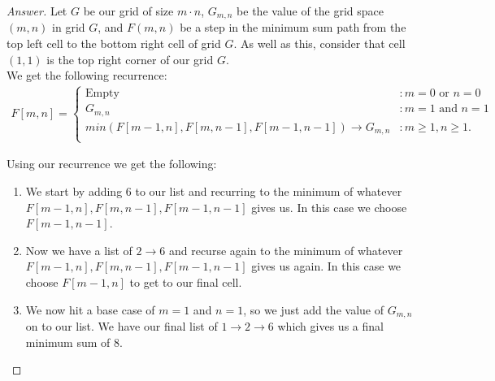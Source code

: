 \documentclass[11pt]{article}
\theoremstyle{definition}
\theoremstyle{definition}
\theoremstyle{definition}
\begin{document}
\begin{proof}[Answer]
Let $G$ be our grid of size $m \cdot n$, $G_{m,n}$ be the value of the grid space $(m , n)$ in grid $G$, and $F(m,n)$ be a step in the minimum sum path from the top left cell to the bottom right cell of grid $G$. As well as this, consider that cell $(1,1)$ is the top right corner of our grid $G$.\\

We get the following recurrence:\\

\begin{align*}
	F[m, n]= \begin{cases}
		\text{Empty} & : m = 0 \text{ or } n = 0 \\
		G_{m,n} &: m = 1 \text{ and } n = 1 \\
		min(F[m - 1, n], F[m , n -1], F[m - 1 , n - 1]) \to G_{m,n} &: m \geq 1, n \geq 1.\\
	\end{cases}
\end{align*}

Using our recurrence we get the following:\\

\begin{enumerate}
	\item  We start by adding $6$ to our list and recurring to the minimum of whatever $F[m - 1, n], F[m , n -1], F[m - 1 , n - 1]$ gives us. In this case we choose $F[m - 1 , n - 1]$.\\
	
	\item Now we have a list of $2 \to 6$ and recurse again to the minimum of whatever $F[m - 1, n], F[m , n -1], F[m - 1 , n - 1]$ gives us again. In this case we choose $F[m - 1, n]$ to get to our final cell.\\
	
	\item We now hit a base case of $m = 1$ and $n = 1$, so we just add the value of $G_{m, n}$ on to our list. We have our final list of $1 \to 2 \to 6$ which gives us a final minimum sum of 8.\\
\end{enumerate}
\end{proof}





\end{document}
